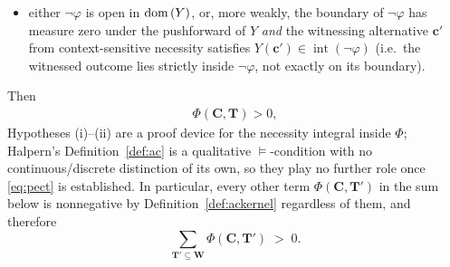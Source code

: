 \begin{theorem}
\begin{itemize}
    $\mathbf{c}'$ under fixed $\mathbf{u}$;
    \item[(ii)] either $\neg\varphi$ is open in $\operatorname{dom}\,(Y)$, or, more weakly, the
    boundary of $\neg\varphi$ has measure zero under the pushforward of $Y$
    \emph{and} the witnessing alternative $\mathbf{c}'$ from context-sensitive
    necessity satisfies $Y(\mathbf{c}')\in\operatorname{int}(\neg\varphi)$ (i.e.\
    the witnessed outcome lies strictly inside $\neg\varphi$, not exactly on its
    boundary).
    \end{itemize}
    Then
    \begin{align}
    \Phi(\mathbf{C},\mathbf{T}) > 0,
    \label{eq:pect}
    \end{align}
    Hypotheses (i)--(ii) are a proof device for the necessity integral inside $\Phi$;
    Halpern's Definition~\ref{def:ac} is a qualitative $\vDash$-condition with no
    continuous/discrete distinction of its own, so they play no further role once
    \eqref{eq:pect} is established. In particular, every other term
    $\Phi(\mathbf{C},\mathbf{T}')$ in the sum below is nonnegative by
    Definition~\ref{def:ackernel} regardless of them, and therefore
    \[
    \sum_{\mathbf{T}'\subseteq\mathbf{W}} \Phi(\mathbf{C},\mathbf{T}')\;>\;0.
    \]
\end{theorem}

